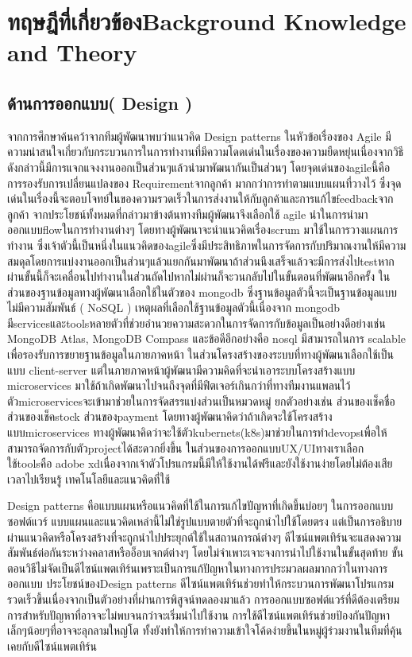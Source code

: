 \chapter{\ifcpe ทฤษฎีที่เกี่ยวข้อง\else Background Knowledge and Theory\fi}


\section{ด้านการออกแบบ( Design )}
จากการศึกษาค้นคว้าจากทีมผู้พัฒนาพบว่าแนวคิด Design patterns ในหัวข้อเรื่องของ Agile มีความน่าสนใจเกี่ยวกับกระบวนการในการทำงานที่มีความโดดเด่นในเรื่องของความยืดหยุ่นเนื่องจากวิธีดังกล่าวนี้มีการแจกแจงงานออกเป็นส่วนๆแล้วนำมาพัฒนากันเป็นส่วนๆ โดยจุดเด่นของagileนี้คือ การรองรับการเปลี่ยนแปลงของ Requirementจากลูกค้า มากกว่าการทำตามแบบแผนที่วางไว้ ซึ่งจุดเด่นในเรื่องนี้จะตอบโจทย์ในของความรวดเร็วในการส่งงานให้กับลูกค้าและการแก้ไขfeedbackจากลูกค้า จากประโยชน์ทั้งหมดที่กล่าวมาข้างต้นทางทีมผู้พัฒนาจึงเลือกใช้ agile นำในการนำมาออกแบบflowในการทำงานต่างๆ โดยทางผู้พัฒนาจะนำแนวคิดเรื่องscrum มาใช้ในการวางแผนการทำงาน ซึ่งเจ้าตัวนี้เป็นหนึ่งในแนวคิดของagileซึ่งมีประสิทธิภาพในการจัดการกับปริมาณงานให้มีความสมดุลโดยการแบ่งงานออกเป็นส่วนๆแล้วแยกกันมาพัฒนาถ้าส่วนนึงเสร็จแล้วจะมีการส่งไปtestหากผ่านขั้นนี้ก็จะเคลื่อนไปทำงานในส่วนถัดไปหากไม่ผ่านก็จะวนกลับไปในขั้นตอนที่พัฒนาอีกครั้ง  
ในส่วนของฐานข้อมูลทางผู้พัฒนาเลือกใช้ในตัวของ mongodb ซึ่งฐานข้อมูลตัวนี้จะเป็นฐานข้อมูลแบบไม่มีความสัมพันธ์ ( NoSQL ) เหตุผลที่เลือกใช้ฐานข้อมูลตัวนี้เนื่องจาก mongodb มีservicesและtoolsหลายตัวที่ช่วยอำนวยความสะดวกในการจัดการกับข้อมูลเป็นอย่างดีอย่างเช่น MongoDB Atlas, MongoDB Compass และข้อดีอีกอย่างคือ nosql มีสามารถในการ scalable เพื่อรองรับการขยายฐานข้อมูลในภายภาคหน้า ในส่วนโครงสร้างของระบบที่ทางผู้พัฒนาเลือกใช้เป็นแบบ client-server แต่ในภายภาคหน้าผู้พัฒนามีความคิดที่จะนำเอาระบบโครงสร้างแบบ microservices มาใช้ถ้าเกิดพัฒนาไปจนถึงจุดที่มีฟีตเจอร์เกินกว่าที่ทางทีมงานแพลนไว้ ตัวmicroservicesจะเข้ามาช่วยในการจัดสรรแบ่งส่วนเป็นหมวดหมู่ ยกตัวอย่างเช่น ส่วนของเช็คชื่อ ส่วนของเช็คstock ส่วนของpayment โดยทางผู้พัฒนาคิดว่าถ้าเกิดจะใช้โครงสร้างแบบmicroservices ทางผู้พัฒนาคิดว่าจะใช้ตัวkubernets(k8s)มาช่วยในการทำdevopsเพื่อให้สามารถจัดการกับตัวprojectได้สะดวกยิ่งขึ้น
	ในส่วนของการออกแบบUX/UIทางเราเลือกใช้toolsคือ adobe xdเนื่องจากเจ้าตัวโปรแกรมนี้มีให้ใช้งานได้ฟรีและยังใช้งานง่ายโดยไม่ต้องเสียเวลาไปเรียนรู้
  เทคโนโลยีและแนวคิดที่ใช้

  Design patterns 
  คือแบบแผนหรือแนวคิดที่ใช้ในการแก้ไขปัญหาที่เกิดขึ้นบ่อยๆ ในการออกแบบซอฟต์แวร์ แบบแผนและแนวคิดเหล่านี้ไม่ใช่รูปแบบตายตัวที่จะถูกนำไปใช้โดยตรง แต่เป็นการอธิบายผ่านแนวคิดหรือโครงสร้างที่จะถูกนำไปประยุกต์ใช้ในสถานการณ์ต่างๆ 
  ดีไซน์แพตเทิร์นจะแสดงความสัมพันธ์ต่อกันระหว่างคลาสหรืออ็อบเจกต์ต่างๆ โดยไม่จำเพาะเจาะจงการนำไปใช้งานในขั้นสุดท้าย ขั้นตอนวิธีไม่จัดเป็นดีไซน์แพตเทิร์นเพราะเป็นการแก้ปัญหาในทางการประมวลผลมากกว่าในทางการออกแบบ
  ประโยชน์ของDesign patterns
  ดีไซน์แพตเทิร์นช่วยทำให้กระบวนการพัฒนาโปรแกรมรวดเร็วขึ้นเนื่องจากเป็นตัวอย่างที่ผ่านการพิสูจน์ทดลองมาแล้ว การออกแบบซอฟต์แวร์ที่ดีต้องเตรียมการสำหรับปัญหาที่อาจจะไม่พบจนกว่าจะเริ่มนำไปใช้งาน การใช้ดีไซน์แพตเทิร์นช่วยป้องกันปัญหาเล็กๆน้อยๆที่อาจจะลุกลามใหญ่โต ทั้งยังทำให้การทำความเข้าใจโค้ดง่ายขึ้นในหมู่ผู้ร่วมงานในทีมที่คุ้นเคยกับดีไซน์แพตเทิร์น
  
